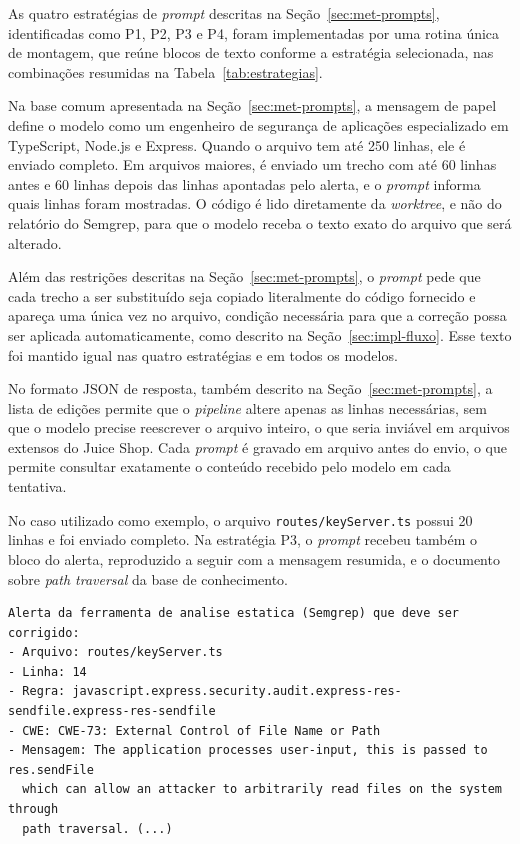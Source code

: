 As quatro estratégias de \textit{prompt} descritas na Seção~\ref{sec:met-prompts}, identificadas como P1, P2, P3 e P4, foram implementadas por uma rotina única de montagem, que reúne blocos de texto conforme a estratégia selecionada, nas combinações resumidas na Tabela~\ref{tab:estrategias}.

Na base comum apresentada na Seção~\ref{sec:met-prompts}, a mensagem de papel define o modelo como um engenheiro de segurança de aplicações especializado em TypeScript, Node.js e Express. Quando o arquivo tem até 250 linhas, ele é enviado completo. Em arquivos maiores, é enviado um trecho com até 60 linhas antes e 60 linhas depois das linhas apontadas pelo alerta, e o \textit{prompt} informa quais linhas foram mostradas. O código é lido diretamente da \textit{worktree}, e não do relatório do Semgrep, para que o modelo receba o texto exato do arquivo que será alterado.

Além das restrições descritas na Seção~\ref{sec:met-prompts}, o \textit{prompt} pede que cada trecho a ser substituído seja copiado literalmente do código fornecido e apareça uma única vez no arquivo, condição necessária para que a correção possa ser aplicada automaticamente, como descrito na Seção~\ref{sec:impl-fluxo}. Esse texto foi mantido igual nas quatro estratégias e em todos os modelos.

No formato JSON de resposta, também descrito na Seção~\ref{sec:met-prompts}, a lista de edições permite que o \textit{pipeline} altere apenas as linhas necessárias, sem que o modelo precise reescrever o arquivo inteiro, o que seria inviável em arquivos extensos do Juice Shop. Cada \textit{prompt} é gravado em arquivo antes do envio, o que permite consultar exatamente o conteúdo recebido pelo modelo em cada tentativa.

No caso utilizado como exemplo, o arquivo \texttt{routes/keyServer.ts} possui 20 linhas e foi enviado completo. Na estratégia P3, o \textit{prompt} recebeu também o bloco do alerta, reproduzido a seguir com a mensagem resumida, e o documento sobre \textit{path traversal} da base de conhecimento.

{\footnotesize
\begin{verbatim}
Alerta da ferramenta de analise estatica (Semgrep) que deve ser corrigido:
- Arquivo: routes/keyServer.ts
- Linha: 14
- Regra: javascript.express.security.audit.express-res-sendfile.express-res-sendfile
- CWE: CWE-73: External Control of File Name or Path
- Mensagem: The application processes user-input, this is passed to res.sendFile
  which can allow an attacker to arbitrarily read files on the system through
  path traversal. (...)
\end{verbatim}
}

